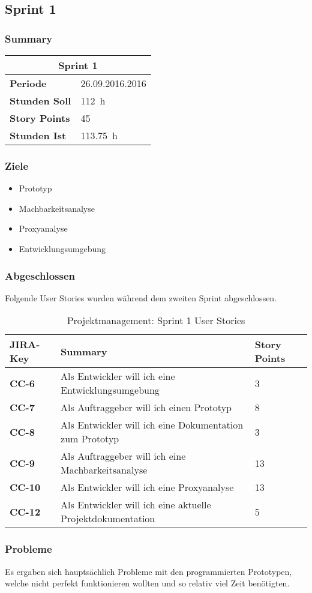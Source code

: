 \subsection{Sprint 1}

\subsubsection*{Summary}

\begin{table}[H]
	\centering
	\begin{tabular}{ll}
		\toprule
		\multicolumn{2}{c}{\textbf{Sprint 1}}\\
		\midrule
		\textbf{Periode} & 26.09.2016\textendash 09.10.2016\\
		\textbf{Stunden Soll} & \SI{112}{\hour}\\
		\textbf{Story Points} & 45\\
		\textbf{Stunden Ist} & \SI{113,75}{\hour}\\
		\bottomrule
	\end{tabular}
\end{table}

\subsubsection*{Ziele}
\begin{itemize}
  \item Prototyp
  \item Machbarkeitsanalyse
  \item Proxyanalyse
  \item Entwicklungsumgebung
\end{itemize}


\subsubsection*{Abgeschlossen}
Folgende User Stories wurden während dem zweiten Sprint abgeschlossen.
\begin{table}[H]
    \centering
	\begin{tabularx}{\textwidth}{l X l}
	\toprule
	\textbf{JIRA-Key} & \textbf{Summary} & \textbf{Story Points}\\
	\midrule
        \textbf{CC-6} & Als Entwickler will ich eine Entwicklungsumgebung & 3 \\
         \textbf{CC-7} & Als Auftraggeber will ich einen Prototyp & 8\\
          \textbf{CC-8} & Als Entwickler will ich eine Dokumentation zum Prototyp & 3\\
          \textbf{CC-9} & Als Auftraggeber will ich eine Machbarkeitsanalyse & 13\\
          \textbf{CC-10} & Als Entwickler will ich eine Proxyanalyse & 13 \\
          \textbf{CC-12} & Als Entwickler will ich eine aktuelle Projektdokumentation & 5 \\
	\bottomrule
    \end{tabularx}
    \caption{Projektmanagement: Sprint 1 User Stories}
\end{table}

\subsubsection*{Probleme}
Es ergaben sich hauptsächlich Probleme mit den programmierten Prototypen, welche 
nicht perfekt funktionieren wollten und so relativ viel Zeit benötigten.
